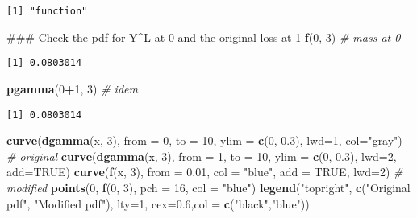 \documentclass[]{book}
\newenvironment{Shaded}{\begin{snugshade}}{\end{snugshade}}
\newcommand{\KeywordTok}[1]{\textcolor[rgb]{0.13,0.29,0.53}{\textbf{#1}}}
\newcommand{\DataTypeTok}[1]{\textcolor[rgb]{0.13,0.29,0.53}{#1}}
\newcommand{\DecValTok}[1]{\textcolor[rgb]{0.00,0.00,0.81}{#1}}
\newcommand{\FloatTok}[1]{\textcolor[rgb]{0.00,0.00,0.81}{#1}}
\newcommand{\StringTok}[1]{\textcolor[rgb]{0.31,0.60,0.02}{#1}}
\newcommand{\CommentTok}[1]{\textcolor[rgb]{0.56,0.35,0.01}{\textit{#1}}}
\newcommand{\OtherTok}[1]{\textcolor[rgb]{0.56,0.35,0.01}{#1}}
\newcommand{\OperatorTok}[1]{\textcolor[rgb]{0.81,0.36,0.00}{\textbf{#1}}}
\newcommand{\NormalTok}[1]{#1}
\theoremstyle{definition}
\theoremstyle{definition}
\theoremstyle{definition}
\theoremstyle{remark}
\begin{document}
\begin{verbatim}
[1] "function"
\end{verbatim}

\begin{Shaded}
\begin{Highlighting}[]
\NormalTok{### Check the pdf for Y^L at 0 and the original loss at 1}
\KeywordTok{f}\NormalTok{(}\DecValTok{0}\NormalTok{, }\DecValTok{3}\NormalTok{) }\CommentTok{# mass at 0}
\end{Highlighting}
\end{Shaded}

\begin{verbatim}
[1] 0.0803014
\end{verbatim}

\begin{Shaded}
\begin{Highlighting}[]
\KeywordTok{pgamma}\NormalTok{(}\DecValTok{0}\OperatorTok{+}\DecValTok{1}\NormalTok{, }\DecValTok{3}\NormalTok{) }\CommentTok{# idem}
\end{Highlighting}
\end{Shaded}

\begin{verbatim}
[1] 0.0803014
\end{verbatim}

\begin{Shaded}
\begin{Highlighting}[]
\KeywordTok{curve}\NormalTok{(}\KeywordTok{dgamma}\NormalTok{(x, }\DecValTok{3}\NormalTok{), }\DataTypeTok{from =} \DecValTok{0}\NormalTok{, }\DataTypeTok{to =} \DecValTok{10}\NormalTok{, }\DataTypeTok{ylim =} \KeywordTok{c}\NormalTok{(}\DecValTok{0}\NormalTok{, }\FloatTok{0.3}\NormalTok{), }\DataTypeTok{lwd=}\DecValTok{1}\NormalTok{, }\DataTypeTok{col=}\StringTok{"gray"}\NormalTok{) }\CommentTok{# original}
\KeywordTok{curve}\NormalTok{(}\KeywordTok{dgamma}\NormalTok{(x, }\DecValTok{3}\NormalTok{), }\DataTypeTok{from =} \DecValTok{1}\NormalTok{, }\DataTypeTok{to =} \DecValTok{10}\NormalTok{, }\DataTypeTok{ylim =} \KeywordTok{c}\NormalTok{(}\DecValTok{0}\NormalTok{, }\FloatTok{0.3}\NormalTok{), }\DataTypeTok{lwd=}\DecValTok{2}\NormalTok{, }\DataTypeTok{add=}\OtherTok{TRUE}\NormalTok{)}
\KeywordTok{curve}\NormalTok{(}\KeywordTok{f}\NormalTok{(x, }\DecValTok{3}\NormalTok{), }\DataTypeTok{from =} \FloatTok{0.01}\NormalTok{, }\DataTypeTok{col =} \StringTok{"blue"}\NormalTok{, }\DataTypeTok{add =} \OtherTok{TRUE}\NormalTok{, }\DataTypeTok{lwd=}\DecValTok{2}\NormalTok{) }\CommentTok{# modified}
\KeywordTok{points}\NormalTok{(}\DecValTok{0}\NormalTok{, }\KeywordTok{f}\NormalTok{(}\DecValTok{0}\NormalTok{, }\DecValTok{3}\NormalTok{), }\DataTypeTok{pch =} \DecValTok{16}\NormalTok{, }\DataTypeTok{col =} \StringTok{"blue"}\NormalTok{)}
\KeywordTok{legend}\NormalTok{(}\StringTok{"topright"}\NormalTok{, }\KeywordTok{c}\NormalTok{(}\StringTok{"Original pdf"}\NormalTok{, }\StringTok{"Modified pdf"}\NormalTok{), }\DataTypeTok{lty=}\DecValTok{1}\NormalTok{, }\DataTypeTok{cex=}\FloatTok{0.6}\NormalTok{,}\DataTypeTok{col =} \KeywordTok{c}\NormalTok{(}\StringTok{"black"}\NormalTok{,}\StringTok{"blue"}\NormalTok{))}
\end{Highlighting}
\end{Shaded}
\end{document}
